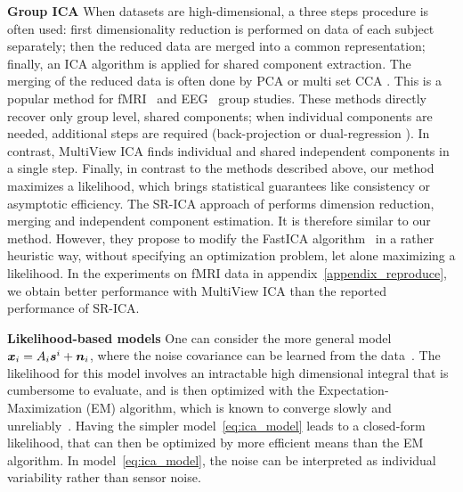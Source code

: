 \textbf{Group ICA} When datasets are high-dimensional, a three steps procedure is often used: first dimensionality reduction is performed on data of each subject  separately; then the reduced data are merged into a common representation; finally, an ICA algorithm is applied for shared component extraction. The merging of the reduced data is often done by PCA \cite{calhoun2001method} or multi set CCA \cite{varoquaux2009canica}.
This is a popular method for fMRI~\cite{calhoun2009review} and EEG~\cite{eichele2011eegift} group studies.
These methods directly recover only group level, shared components; when individual components are needed, additional steps are required (back-projection \cite{calhoun2001method} or dual-regression \cite{beckmann2009group}).
%
In contrast, MultiView ICA finds individual and shared independent components in a single step.
%
%
Finally, in contrast to the methods described above, our method maximizes a likelihood, which brings statistical guarantees like consistency or asymptotic efficiency.
%
The SR-ICA approach of \cite{zhang2016searchlight} performs dimension reduction, merging and independent component estimation. It is therefore similar to our method.
%
However, they propose to modify the FastICA algorithm~\cite{hyvarinen1999fast} in a rather heuristic way, without specifying an optimization problem, let alone maximizing a likelihood. In the experiments on fMRI data in appendix~\ref{appendix_reproduce}, we obtain better performance with MultiView ICA than the reported performance of SR-ICA.
%
%

\textbf{Likelihood-based models} One can consider the more general model $\boldsymbol{x}_i = A_i\boldsymbol{s}^i + \boldsymbol{n}_i$, where the noise covariance can be learned from the data~\cite{guo2008unified}.
%
The likelihood for this model involves an intractable high dimensional integral that is cumbersome to evaluate, and is then optimized with the Expectation-Maximization (EM) algorithm, which is known to converge slowly and unreliably~\cite{bermond1999approximate, petersen2005slow}.
%
Having the simpler model~\eqref{eq:ica_model} leads to a closed-form likelihood, that can then be optimized by more efficient means than the EM algorithm.
In model~\eqref{eq:ica_model}, the noise can be interpreted as individual variability rather than sensor noise. %
%
%
%

